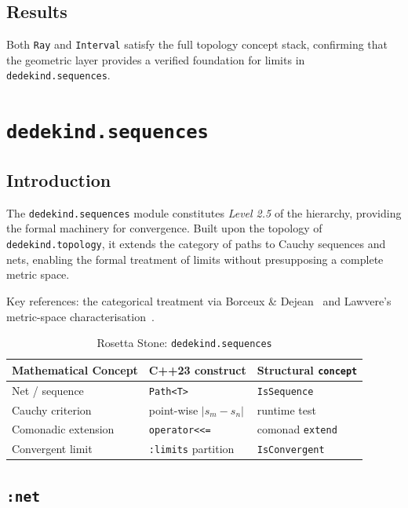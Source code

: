 \documentclass[11pt, a4paper]{report}
\begin{document}
\section{Results}

Both \texttt{Ray} and \texttt{Interval} satisfy the full topology concept stack, confirming that the geometric layer provides a verified foundation for limits in \texttt{dedekind.sequences}.


\chapter{\texttt{dedekind.sequences}}
\label{chap:sequences}

\section{Introduction}

The \texttt{dedekind.sequences} module constitutes \emph{Level 2.5} of the hierarchy, providing the formal machinery for convergence.
Built upon the topology of \texttt{dedekind.topology}, it extends the category of paths to Cauchy sequences and nets, enabling the formal treatment of limits without presupposing a complete metric space.

Key references: the categorical treatment via Borceux \& Dejean~\cite{borceux1986cauchy} and Lawvere's metric-space characterisation~\cite{lawvere1973metric}.

\begin{table}[ht]
\centering
\caption{Rosetta Stone: \texttt{dedekind.sequences}}
\label{table:sequences}
\begin{tabular}{lll}
\toprule
\textbf{Mathematical Concept} & \textbf{C++23 construct} & \textbf{Structural \texttt{concept}} \\
\midrule
Net / sequence & \texttt{Path<T>} & \texttt{IsSequence} \\
Cauchy criterion & point-wise $|s_m - s_n|$ & runtime test \\
Comonadic extension & \texttt{operator<<=} & comonad \texttt{extend} \\
Convergent limit & \texttt{:limits} partition & \texttt{IsConvergent} \\
\bottomrule
\end{tabular}
\end{table}

\section{\texttt{:net}}
\label{sec:sequences-net}
\end{document}
